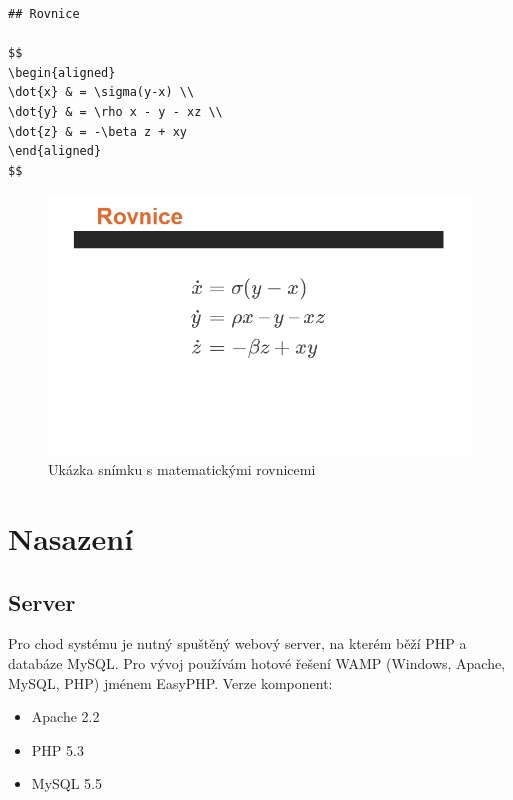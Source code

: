 \documentclass[11pt,twoside,a4paper]{book}
\begin{document}
\begin{lstlisting}[caption={Ukázka syntaxe matematických vzorců},label={lst:rovnice}]
## Rovnice

$$
\begin{aligned}
\dot{x} & = \sigma(y-x) \\
\dot{y} & = \rho x - y - xz \\
\dot{z} & = -\beta z + xy
\end{aligned}
$$
\end{lstlisting}

\begin{figure}[ht]
	\begin{center}
		\includegraphics[width=14cm]{PRO-img/rovnice.png}
		\caption{Ukázka snímku s matematickými rovnicemi}
		\label{fig:rovnice}
	\end{center}
\end{figure}



\chapter{Nasazení}

\section{Server}
Pro chod systému je nutný spuštěný webový server, na kterém běží PHP a databáze MySQL. Pro vývoj používám hotové řešení WAMP (Windows, Apache, MySQL, PHP) jménem EasyPHP. Verze komponent:

\begin{itemize}
	\item Apache 2.2
	\item PHP 5.3
	\item MySQL 5.5
\end{itemize}
\end{document}
